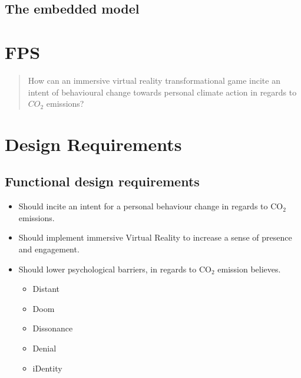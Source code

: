     
    
    \subsection{The embedded model}
    


\section{FPS}\label{sec:FPS}
\begin{quote}
    How can an immersive virtual reality transformational game incite an intent of behavioural change towards personal climate action in regards to $CO_{2}$ emissions? 
\end{quote}

\section{Design Requirements}\label{designReq}

\subsection{Functional design requirements}
\begin{itemize}
    \item Should incite an intent for a personal behaviour change in regards to CO$_2$ emissions.
    \item Should implement immersive Virtual Reality to increase a sense of presence and engagement.
    \item Should lower psychological barriers, in regards to CO$_2$ emission believes.\cite{the5Ds}
    \begin{itemize}
        \item Distant
        \item Doom
        \item Dissonance
        \item Denial
        \item iDentity
    \end{itemize}
\end{itemize}


